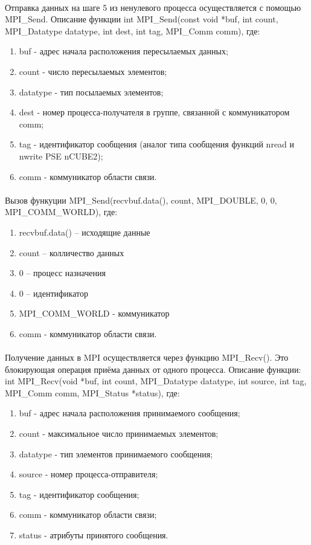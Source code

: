 \documentclass[12pt,a4paper]{article}
\begin{document}
\paragraph{}Отправка данных на шаге 5 из ненулевого процесса осуществляется с помощью MPI\_Send. 
Описание функции int MPI\_Send(const void *buf, int count, MPI\_Datatype datatype, int dest, int tag, MPI\_Comm comm), где:
\begin{enumerate} 
\item buf	-	адрес начала расположения пересылаемых данных;
\item count	-	число пересылаемых элементов;
\item datatype	-	тип посылаемых элементов;
\item dest	-	номер процесса-получателя в группе, связанной с коммуникатором comm;
\item tag	-	идентификатор сообщения (аналог типа сообщения функций nread и nwrite PSE nCUBE2);
\item comm	-	коммуникатор области связи.
\end{enumerate} 
\paragraph{}Вызов функуции MPI\_Send(recvbuf.data(), count, MPI\_DOUBLE, 0, 0, MPI\_COMM\_WORLD), где:
\begin{enumerate} 
\item recvbuf.data() – исходящие данные
\item count – колличество данных
\item 0 – процесс назначения
\item 0 – идентификатор
\item MPI\_COMM\_WORLD - коммуникатор
\item comm	-	коммуникатор области связи.
\end{enumerate} 
\paragraph{}Получение данных в MPI осуществляется через функцию MPI\_Recv(). Это блокирующая операция приёма данных от одного процесса. Описание функции: int MPI\_Recv(void *buf, int count, MPI\_Datatype datatype, int source, int tag, MPI\_Comm comm, MPI\_Status *status), где:
\begin{enumerate} 
\item buf	-	адрес начала расположения принимаемого сообщения;
\item count	-	максимальное число принимаемых элементов;
\item datatype	-	тип элементов принимаемого сообщения;
\item source	-	номер процесса-отправителя;
\item tag	-	идентификатор сообщения;
\item comm	-	коммуникатор области связи;
\item status	-	атрибуты принятого сообщения.
\end{enumerate} 
\end{document}
